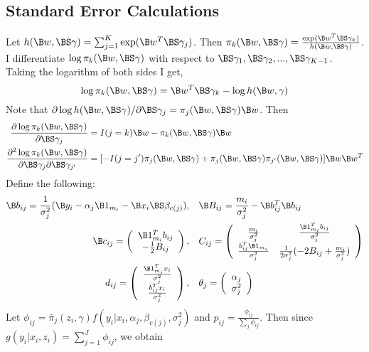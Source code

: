\subsection{Standard Error Calculations}
Let $h(\B w,\BS\gamma)=\sum^{K}_{j=1}\exp(\B w^{T}\BS\gamma_{j})$. Then $\pi_{k}(\B w,\BS\gamma)=\frac{\exp(\B w^{T}\BS\gamma_{k})}{h(\B w,\BS\gamma)}$. I differentiate $\log\pi_{k}(\B w,\BS\gamma)$ with respect to $\BS\gamma_{1},\BS\gamma_{2},...,\BS\gamma_{K-1}$. Taking the logarithm of both sides I get,
$$\log\pi_{k}(\B w,\BS\gamma)=\B w^{T}\BS\gamma_{k}-\log h(\B w,\gamma)$$
Note that $\partial \log h(\B w,\BS\gamma)/\partial \BS\gamma_{j}=\pi_{j}(\B w,\BS\gamma)\B w$. Then
\begin{align*}
\frac{\partial \log\pi_{k}(\B w,\BS\gamma) }{\partial \BS\gamma_{j}} &= I(j=k)\B w-\pi_{k}(\B w,\BS\gamma)\B w\\
\frac{\partial^{2} \log\pi_{k}(\B w,\BS\gamma) }{\partial \BS\gamma_{j}\partial \BS\gamma_{j'}} &= [-I(j=j')\pi_{j}(\B w,\BS\gamma)+\pi_{j}(\B w,\BS\gamma)\pi_{j'}(\B w,\BS\gamma)]\B w\B w^{T}\\
\end{align*}
Define the following:
\begin{align*}
\B b_{ij} = \frac{1}{\sigma_{j}^{2}}(\B y_{i}-\alpha_{j}\B 1_{m_i}-\B x_{i}\BS\beta_{c(j)}),&\quad \B B_{ij}=\frac{m_{i}}{\sigma^{2}_{j}}-\B b_{ij}^{T}\B b_{ij}\\
\B c_{ij} = \left(\begin{array}{c}
\B 1_{m_i}^{T} b_{ij}\\
-\frac{1}{2}B_{ij}
\end{array}\right),&\quad C_{ij} =\left(\begin{array}{cc}
\frac{m_{i}}{\sigma^{2}_{j}}&\frac{\B 1_{m_i}^{T}b_{ij}}{\sigma^{2}_{j}}\\
\frac{b^{T}_{ij}\B 1_{m_i}}{\sigma^{2}_{j}}&\frac{1}{2\sigma_{j}^{2}}(-2B_{ij}+\frac{m_{i}}{\sigma^{2}_{j}})
\end{array}\right)\\
d_{ij}=\left(\begin{array}{c}
\frac{\B 1_{m_i}^{T}x_{i}}{\sigma^{2}_{j}}\\
\frac{b_{ij}^{T}x_{i}}{\sigma^{2}_{j}}\end{array}\right),&
\quad \theta_{j}=\left(\begin{array}{c}
\alpha_{j}\\
\sigma_{j}^{2}\end{array}\right)
\end{align*}
Let $\phi_{ij} = \bar{\pi}_{j}(z_{i},\gamma)f(y_{i}|x_{i},\alpha_{j},\beta_{c(j)},\sigma^{2}_{j})$ and $p_{ij} = \frac{\phi_{ij}}{\sum_{j} \phi_{ij}}$. Then since $g(y_{i}|x_{i},z_{i})=\sum_{j=1}^{J}\phi_{ij}$, we obtain
